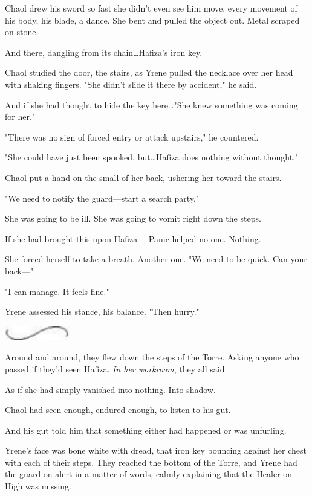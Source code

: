 Chaol drew his sword so fast she didn't even see him move, every movement of his body, his blade, a dance.
She bent and pulled the object out.
Metal scraped on stone.

And there, dangling from its chain\ldots Hafiza's iron key.

Chaol studied the door, the stairs, as Yrene pulled the necklace over her head with shaking fingers.
"She didn't slide it there by accident," he said.

And if she had thought to hide the key here\ldots "She knew something was coming for her."

"There was no sign of forced entry or attack upstairs," he countered.

"She could have just been spooked, but\ldots Hafiza does nothing without thought."

Chaol put a hand on the small of her back, ushering her toward the stairs.

"We need to notify the guard---start a search party."

She was going to be ill.
She was going to vomit right down the steps.

If she had brought this upon Hafiza--- Panic helped no one.
Nothing.

She forced herself to take a breath.
Another one.
"We need to be quick.
Can your back---"

"I can manage.
It feels fine."

Yrene assessed his stance, his balance.
"Then hurry."

\begin{center}
	\includegraphics[width=1.12in,height=0.24in]{images/seperator}
\end{center}

Around and around, they flew down the steps of the Torre.
Asking anyone who passed if they'd seen Hafiza.
\emph{In her workroom}, they all said.

As if she had simply vanished into nothing.
Into shadow.

Chaol had seen enough, endured enough, to listen to his gut.

And his gut told him that something either had happened or was unfurling.

Yrene's face was bone white with dread, that iron key bouncing against her chest with each of their steps.
They reached the bottom of the Torre, and Yrene had the guard on alert in a matter of words, calmly explaining that the Healer on High was missing.

